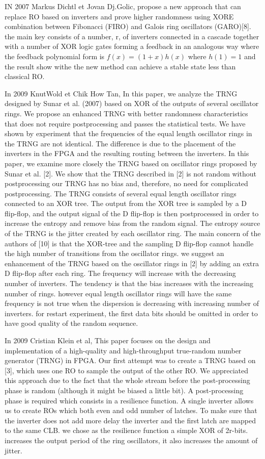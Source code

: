 IN 2007 Markus Dichtl et Jovan Dj.Golic, propose a new approach that can replace RO based on inverters and prove higher randomness using XORE combination between Fibonacci (FIRO) and Galois ring oscillators (GARO)[8]. the main key consists of a number, r, of inverters connected in a cascade together with a number of XOR logic gates forming a feedback in an analogous way where the feedback polynomial form is $f(x) = (1+x)h(x)$ where $h(1)=1$ and the result show withe the new method can achieve a stable state less than classical RO. 

In 2009 KnutWold et Chik How Tan, In this paper, we analyze the TRNG designed by Sunar et al. (2007) based on XOR of the outputs of several oscillator rings. We propose an enhanced TRNG with better randomness characteristics that does not require postprocessing and passes the statistical tests. We have shown by experiment that the frequencies of the equal length oscillator rings in the TRNG are not identical. The difference is due to the placement of the inverters in the FPGA and the resulting routing between the inverters. In this paper, we examine more closely the TRNG based on oscillator rings proposed by Sunar et al. [2]. We show that the TRNG described in [2] is not random without postprocessing our TRNG has no bias and, therefore, no need for complicated postprocessing. The TRNG consists of several equal length oscillator rings connected to an XOR tree. The output from the XOR tree is sampled by a D flip-flop, and the output signal of the D flip-flop is then postprocessed in order to increase the entropy and remove bias from the random signal. The entropy source of the TRNG is the jitter created by each oscillator ring. The main concern of the authors of [10] is that the XOR-tree and the sampling D flip-flop cannot handle the high number of transitions from the oscillator rings. we suggest an enhancement of the TRNG based on the oscillator rings in [2] by adding an extra D flip-flop after each ring. The frequency will increase with the decreasing number of inverters. The tendency is that the bias increases with the increasing number of rings. however equal length oscillator rings will have the same frequency is not true when the dispersion is decreasing with increasing number of inverters. for restart experiment, the first data bits should be omitted in order to have good quality of the random sequence.

In 2009 Cristian Klein et al, This paper focuses on the design and implementation of a high-quality and high-throughput true-random number generator (TRNG) in FPGA. Our first attempt was to create a TRNG based on [3], which uses one RO to sample the output of the other RO. We appreciated this approach due to the fact that the whole stream before the post-processing phase is random (although it might be biased a little bit). A post-processing phase is required which consists in a resilience function. A single inverter allows us to create ROs which both even and odd number of latches. To make sure that the inverter does not add more delay the inverter and the first latch are mapped to the same CLB. we chose as the resilience function a simple XOR of 2r-bits. increases the output period of the ring oscillators, it also increases the amount of jitter. 

